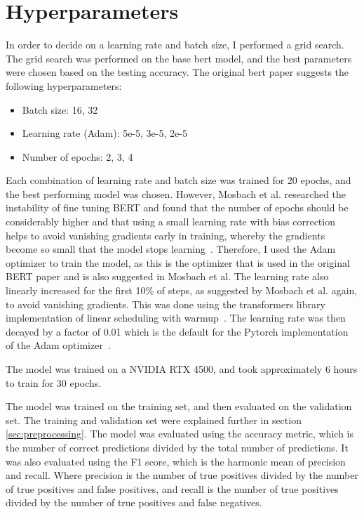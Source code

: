 \documentclass{UoYCSproject}
\begin{document}
    \section{Hyperparameters}\label{sec:hyperparameters}
    In order to decide on a learning rate and batch size, I performed a grid search.
    The grid search was performed on the base bert model, and the best parameters were chosen based on the testing accuracy.
    The original bert paper suggests the following hyperparameters:
    \begin{itemize}
        \item Batch size: 16, 32
        \item Learning rate (Adam): 5e-5, 3e-5, 2e-5
        \item Number of epochs: 2, 3, 4
    \end{itemize}
    Each combination of learning rate and batch size was trained for 20 epochs, and the best performing model was chosen.
    However, Mosbach et al. researched the instability of fine tuning BERT and found that the number of epochs should be considerably higher and that using a small learning rate with bias correction helps to avoid vanishing gradients early in training, whereby the gradients become so small that the model stops learning~\cite{mosbach2021stability}.
    Therefore, I used the Adam optimizer to train the model, as this is the optimizer that is used in the original BERT paper and is also suggested in Mosbach et al.
    The learning rate also linearly increased for the first 10\% of steps, as suggested by Mosbach et al. again, to avoid vanishing gradients.
    This was done using the transformers library implementation of linear scheduling with warmup~\cite{transformerLinearSchedular}.
    The learning rate was then decayed by a factor of 0.01 which is the default for the Pytorch implementation of the Adam optimizer~\cite{adamPytorch}.

    The model was trained on a NVIDIA RTX 4500, and took approximately 6 hours to train for 30 epochs. \par

    The model was trained on the training set, and then evaluated on the validation set.
    The training and validation set were explained further in section \ref{sec:preprocessing}.
    The model was evaluated using the accuracy metric, which is the number of correct predictions divided by the total number of predictions.
    It was also evaluated using the F1 score, which is the harmonic mean of precision and recall.
    Where precision is the number of true positives divided by the number of true positives and false positives, and recall is the number of true positives divided by the number of true positives and false negatives.
\end{document}
